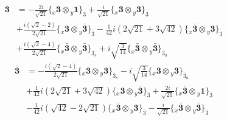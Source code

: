 \documentclass[english]{article}
\newcommand{\rep}[1]{\mathbf{#1}}
\newcommand{\repx}[2]{{}_{#2}\mathbf{#1}}
\newcommand{\tsprodx}[2]{\repx{#1}{x}\otimes\repx{#2}{y}}
\newcommand{\subcgt}[3]{\big\{ \tsprodx{#1}{#2}\big\}^{}_{#3}}
\begin{document}
\begin{itemize}
\begin{fleqn}
\begin{align*}
\end{align*}
\begin{align*}
\rep{3} & = -\frac{2 i}{\sqrt{21}}\subcgt{3}{1}{3}+\frac{i}{\sqrt{21}}\subcgt{3}{3}{3} \\ 
 & +\frac{i \left(\sqrt{2}-2\right)}{2 \sqrt{21}}\subcgt{3}{\bar{3}}{3}-\frac{1}{42} i \left(2 \sqrt{21}+3 \sqrt{42}\right)\subcgt{\bar{3}}{3}{3} \\ 
 & +\frac{i \left(\sqrt{2}-4\right)}{2 \sqrt{21}}\subcgt{\bar{3}}{\bar{3}}{3_{s}}+i \sqrt{\frac{3}{14}}\subcgt{\bar{3}}{\bar{3}}{3_{a}}
\end{align*}
\begin{align*}
\rep{\bar{3}} & = -\frac{i \left(\sqrt{2}-4\right)}{2 \sqrt{21}}\subcgt{3}{3}{\bar{3}_{s}}-i \sqrt{\frac{3}{14}}\subcgt{3}{3}{\bar{3}_{a}} \\ 
 & +\frac{1}{42} i \left(2 \sqrt{21}+3 \sqrt{42}\right)\subcgt{3}{\bar{3}}{\bar{3}}+\frac{2 i}{\sqrt{21}}\subcgt{\bar{3}}{1}{\bar{3}} \\ 
 & -\frac{1}{42} i \left(\sqrt{42}-2 \sqrt{21}\right)\subcgt{\bar{3}}{3}{\bar{3}}-\frac{i}{\sqrt{21}}\subcgt{\bar{3}}{\bar{3}}{\bar{3}}
\end{align*}
\end{fleqn}
\end{itemize}
\end{document}
